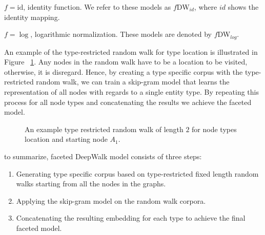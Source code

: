 \begin{inparaenum}
\item  $f=\mathrm{id}$, identity function. We refer to these models as $f$DW$_{id}$, where $id$ shows the identity mapping. \\
\item  $f=\log$, logarithmic normalization. These models are denoted by  $f$DW$_{log}$.\\
\end{inparaenum}
\noindent
An example of the type-restricted random walk for type location is illustrated in Figure~
\ref{fig:facetteddeepwalk}. Any nodes in the random walk have to be a location to be visited, otherwise, it is disregard. Hence, by creating a type specific corpus with the type-restricted random walk, we can train a skip-gram model that learns the representation of all nodes with regards to a single entity type. By repeating this process for all node types and concatenating the results we achieve the faceted model.
\begin{figure}
\centering 
\resizebox{0.60\textwidth}{0.27\textwidth}{      

}
\caption{ An example type restricted random walk of length $2$ for node types location and starting node $A_1$.  }
\label{fig:facetteddeepwalk}
\end{figure} 
\noindent
to summarize, faceted DeepWalk model consists of three steps: 
\begin{enumerate}
\item Generating type specific corpus based on type-restricted fixed length random walks starting from all the nodes in the graphs. 
\item Applying the skip-gram model on the random walk corpora. 
\item Concatenating the resulting embedding for each type to achieve the final faceted model.  
\end{enumerate}

